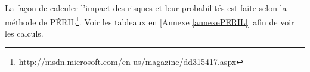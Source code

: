 La façon de calculer l'impact des risques et leur probabilités est faite selon la méthode de PÉRIL\footnote{\url{http://msdn.microsoft.com/en-us/magazine/dd315417.aspx}}. Voir les tableaux en [Annexe \ref{annexePERIL}] afin de voir les calculs. 



